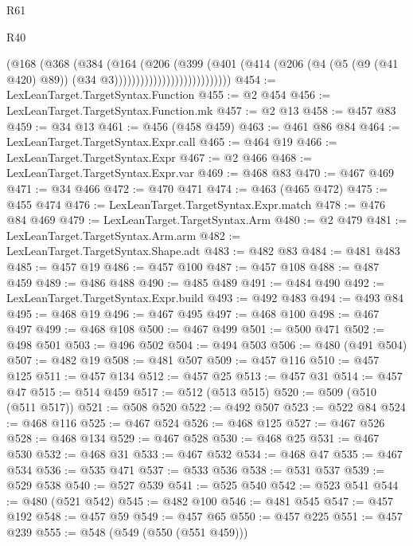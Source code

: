 \begin{lexlean}{R61}
\begin{lexlean}{R40}
\begin{coremodule}
{{{{{{{{{{{{{{{{{{{{{{{{{{{{{{{{{{{{{{{{{{{{{{{{{{{{{{{{{{{{{{{{{{{{{{{{{{{{{{{{{{{{{{{{{{{{{{{{{{{{{{{{{{{{{                                    (@168
                                      (@368
                                        (@384
                                          (@164
                                            (@206
                                              (@399
                                                (@401
                                                  (@414
                                                    (@206
                                                      (@4
                                                        (@5 (@9 (@41 @420) @89))
                                                        (@34 @3)))))))))))))))))))))))))))
@454 := LexLeanTarget.TargetSyntax.Function
@455 := @2 @454
@456 := LexLeanTarget.TargetSyntax.Function.mk
@457 := @2 @13
@458 := @457 @83
@459 := @34 @13
@461 := @456 (@458 @459)
@463 := @461 @86 @84
@464 := LexLeanTarget.TargetSyntax.Expr.call
@465 := @464 @19
@466 := LexLeanTarget.TargetSyntax.Expr
@467 := @2 @466
@468 := LexLeanTarget.TargetSyntax.Expr.var
@469 := @468 @83
@470 := @467 @469
@471 := @34 @466
@472 := @470 @471
@474 := @463 (@465 @472)
@475 := @455 @474
@476 := LexLeanTarget.TargetSyntax.Expr.match
@478 := @476 @84 @469
@479 := LexLeanTarget.TargetSyntax.Arm
@480 := @2 @479
@481 := LexLeanTarget.TargetSyntax.Arm.arm
@482 := LexLeanTarget.TargetSyntax.Shape.adt
@483 := @482 @83
@484 := @481 @483
@485 := @457 @19
@486 := @457 @100
@487 := @457 @108
@488 := @487 @459
@489 := @486 @488
@490 := @485 @489
@491 := @484 @490
@492 := LexLeanTarget.TargetSyntax.Expr.build
@493 := @492 @483
@494 := @493 @84
@495 := @468 @19
@496 := @467 @495
@497 := @468 @100
@498 := @467 @497
@499 := @468 @108
@500 := @467 @499
@501 := @500 @471
@502 := @498 @501
@503 := @496 @502
@504 := @494 @503
@506 := @480 (@491 @504)
@507 := @482 @19
@508 := @481 @507
@509 := @457 @116
@510 := @457 @125
@511 := @457 @134
@512 := @457 @25
@513 := @457 @31
@514 := @457 @47
@515 := @514 @459
@517 := @512 (@513 @515)
@520 := @509 (@510 (@511 @517))
@521 := @508 @520
@522 := @492 @507
@523 := @522 @84
@524 := @468 @116
@525 := @467 @524
@526 := @468 @125
@527 := @467 @526
@528 := @468 @134
@529 := @467 @528
@530 := @468 @25
@531 := @467 @530
@532 := @468 @31
@533 := @467 @532
@534 := @468 @47
@535 := @467 @534
@536 := @535 @471
@537 := @533 @536
@538 := @531 @537
@539 := @529 @538
@540 := @527 @539
@541 := @525 @540
@542 := @523 @541
@544 := @480 (@521 @542)
@545 := @482 @100
@546 := @481 @545
@547 := @457 @192
@548 := @457 @59
@549 := @457 @65
@550 := @457 @225
@551 := @457 @239
@555 := @548 (@549 (@550 (@551 @459)))
}}}}}}}}}}}}}}}}}}}}}}}}}}}}}}}}}}}}}}}}}}}}}}}}}}}}}}}}}}}}}}}}}}}}}}}}}}}}}}}}}}}}}}}}}}}}}}}}}}}}}}}}}}}}}
\end{coremodule}
\end{lexlean}
\end{lexlean}
